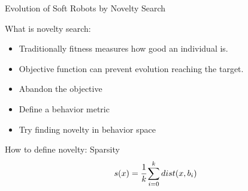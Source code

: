 \documentclass[6pt]{beamer}
\begin{document}
%
%
%
%
%

\begin{frame}{{\scriptsize Evolution of Soft Robots by} Novelty Search~}
\begin{block}{What is novelty search:}
\begin{itemize}
\item Traditionally fitness measures how good an individual is.
\item Objective function can prevent evolution reaching the target.
\item Abandon the objective
\item Define a behavior metric
\item Try finding novelty in behavior space
\end{itemize}
\end{block}
\begin{block}{How to define novelty: Sparsity}
\begin{equation*}
s(x) = \cfrac{1}{k} \sum_{i=0}^k dist(x, b_i)
\end{equation*}
\end{block}
\end{frame}
\end{document}
